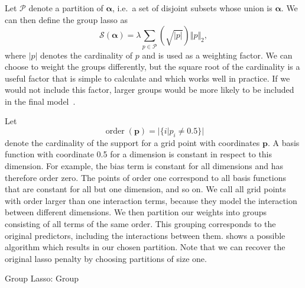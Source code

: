 Let \(\mathcal{P}\) denote a partition of \(\bm{\alpha}\), i.e.~a set of disjoint subsets whose union is \(\bm{\alpha}\).
We can then define the group lasso as
\begin{equation*}
  \mathcal{S}({\bm{\alpha}}) = \lambda \sum_{p \in \mathcal{P}} \left(\sqrt{\vert p \vert}\right) \Vert  p \Vert_2,
\end{equation*}
where \(\vert p \vert\) denotes the cardinality of \(p\) and is used as a weighting factor.
We can choose to weight the groups differently, but the square root of the
cardinality is a useful factor that is simple to calculate and which works well in practice.
If we would not include this factor, larger groups would be more likely to be included in the final model~\cite{sparse-learning}.

Let
\begin{equation*}
  \operatorname{order}(\bm{p}) = \vert \{ i | p_i \neq 0.5 \} \vert
\end{equation*}
denote the cardinality of the support for a grid point with coordinates \(\bm{p}\).
A basis function with coordinate 0.5 for a dimension is constant in respect to
this dimension.
For example, the bias term is constant for all dimensions and has therefore
order zero.
The points of order one correspond to all basis functions that are constant for
all but one dimension, and so on.
We call all grid points with order larger than one interaction terms, because
they model the interaction between different dimensions.
We then partition our weights into groups consisting of all terms of the same order.
This grouping corresponds to the original predictors, including the interactions
between them.
 shows a possible algorithm which results in our chosen
partition.
Note that we can recover the original lasso penalty by choosing partitions of size one.

\begin{algorithm}[h]
\caption{Group Lasso: Group}\label{alg:group} 
 \begin{algorithmic}[1]
   \Statex
      \EndFor
        \Else
      \EndIf
    \EndFor
   \State {}
   \EndFunction
 \end{algorithmic}
 \end{algorithm}

